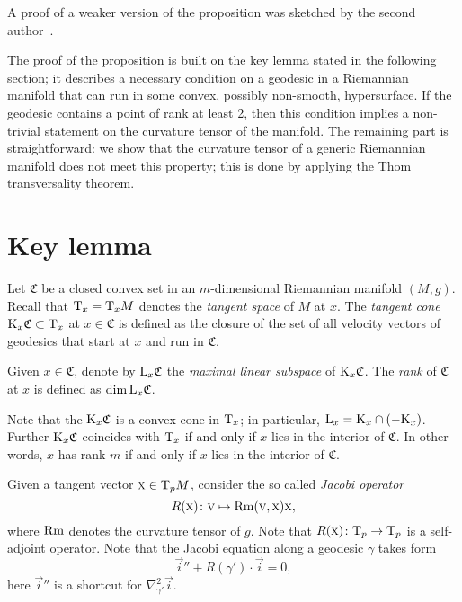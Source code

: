\documentclass[a4paper,10pt]{article}
\begin{document}
A proof of a weaker version of the proposition was sketched by the second author~\cite{petrunin-2009}.

The proof of the proposition is built on the key lemma stated in the following section; 
it describes a necessary condition on a geodesic in a Riemannian manifold that can run in some convex, possibly non-smooth, hypersurface.
If the geodesic contains a point of rank at least 2, then this condition implies a non-trivial
statement on the curvature tensor of the manifold.
The remaining part is straightforward: we show that the curvature tensor of a generic Riemannian manifold does not meet this property; this is done by applying the Thom transversality theorem.


\section{Key lemma}


Let $\mathfrak{C}$ be a closed convex set in an $m$-dimensional Riemannian manifold $(M,g)$.
Recall that $\mathrm{T}_x=\mathrm{T}_xM$ denotes the \emph{tangent space} of $M$ at $x$.
The \emph{tangent cone} $\mathrm{K}_x\mathfrak{C}\subset \mathrm{T}_x$ at $x\in\mathfrak{C}$ is defined as the closure of the set of all velocity vectors of geodesics that start at $x$ and run in $\mathfrak{C}$.

Given $x\in \mathfrak{C}$, denote by $\mathrm{L}_x\mathfrak{C}$ the \emph{maximal linear subspace} of $\mathrm{K}_x\mathfrak{C}$.
The \emph{rank} of $\mathfrak{C}$ at $x$ is defined as $\operatorname{\rm dim} \mathrm{L}_x\mathfrak{C}$.

Note that the $\mathrm{K}_x\mathfrak{C}$ is a convex cone in $\mathrm{T}_x$; in particular, $\mathrm{L}_x=\mathrm{K}_x\cap (-\mathrm{K}_x)$.
Further $\mathrm{K}_x\mathfrak{C}$ coincides with 
$\mathrm{T}_x$ if and only if
$x$ lies in the interior of $\mathfrak{C}$.
In other words, $x$ has rank $m$ if and only if $x$ lies in the interior of $\mathfrak{C}$.%


Given a tangent vector $\text{\sc{x}}\in\mathrm{T}_pM$, consider the so called \emph{Jacobi operator}
\[R(\text{\sc{x}})\colon\text{\sc{v}}\mapsto \operatorname{\rm Rm}(\text{\sc{v}},\text{\sc{x}})\text{\sc{x}},\]
where $\operatorname{\rm Rm}$ denotes the curvature tensor of $g$.
Note that $R(\text{\sc{x}})\colon\mathrm{T}_p\to \mathrm{T}_p$ is a self-adjoint operator.
Note that the Jacobi equation along a geodesic $\gamma$ takes form 
\[\vec{i}''+R(\gamma')\cdot \vec{i}=0,\]
here $\vec{i}''$ is a shortcut for $\nabla^2_{\gamma'}\vec{i}$.
\end{document}

